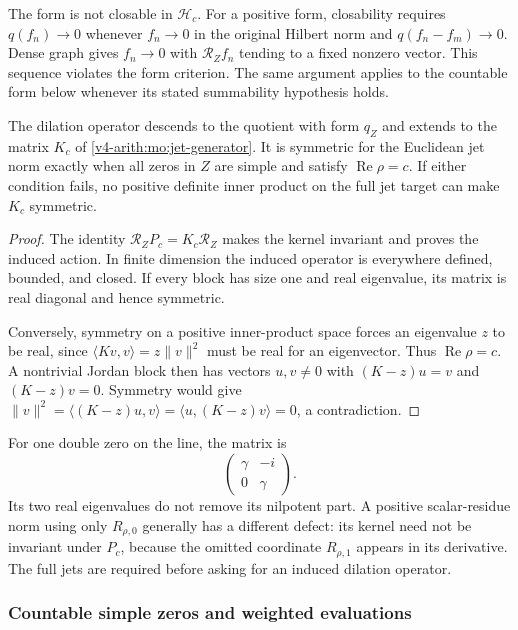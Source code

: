 The form is not closable in $\mathscr H_c$. For a positive form,
closability requires $q(f_n)\to0$ whenever $f_n\to0$ in the
original Hilbert norm and $q(f_n-f_m)\to0$. Dense graph gives
$f_n\to0$ with $\mathcal R_Zf_n$ tending to a fixed nonzero
vector. This sequence violates the form criterion. The same
argument applies to the countable form below whenever its stated
summability hypothesis holds.

\begin{theorem}
\label{v4-arith:mo:finite-symmetry}
The dilation operator descends to the quotient with form $q_Z$ and
extends to the matrix $K_c$ of \eqref{v4-arith:mo:jet-generator}.
It is symmetric for the Euclidean jet norm exactly when all zeros
in $Z$ are simple and satisfy $\operatorname{Re}\rho=c$.
If either condition fails, no positive definite inner product on
the full jet target can make $K_c$ symmetric.
\end{theorem}
\begin{proof}
The identity $\mathcal R_ZP_c=K_c\mathcal R_Z$ makes the kernel
invariant and proves the induced action. In finite dimension the
induced operator is everywhere defined, bounded, and closed.
If every block has size one and real eigenvalue, its matrix is
real diagonal and hence symmetric.

Conversely, symmetry on a positive inner-product space forces
an eigenvalue $z$ to be real, since
$\langle Kv,v\rangle=z\|v\|^2$ must be real for an eigenvector.
Thus $\operatorname{Re}\rho=c$. A nontrivial Jordan block then
has vectors $u,v\ne0$ with $(K-z)u=v$ and $(K-z)v=0$.
Symmetry would give
$\|v\|^2=\langle(K-z)u,v\rangle=
\langle u,(K-z)v\rangle=0$, a contradiction.
\end{proof}

For one double zero on the line, the matrix is
\[
 \begin{pmatrix}\gamma&-i\\0&\gamma\end{pmatrix}.
\]
Its two real eigenvalues do not remove its nilpotent part. A
positive scalar-residue norm using only $R_{\rho,0}$ generally
has a different defect: its kernel need not be invariant under
$P_c$, because the omitted coordinate $R_{\rho,1}$ appears in
its derivative. The full jets are required before asking for
an induced dilation operator.

\subsubsection{Countable simple zeros and weighted evaluations}

